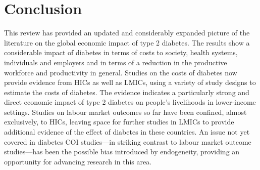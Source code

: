 \section{Conclusion}

This review has provided an updated and considerably expanded picture of the literature on the global economic impact of type 2 diabetes. The results show a considerable impact of diabetes in terms of costs to society, health systems, individuals and employers and in terms of a reduction in the productive workforce and productivity in general. Studies on the costs of diabetes now provide evidence from \acp{HIC} as well as \acp{LMIC}, using a variety of study designs to estimate the costs of diabetes. The evidence indicates a particularly strong and direct economic impact of type 2 diabetes on people's livelihoods in lower-income settings. Studies on labour market outcomes so far have been confined, almost exclusively, to \acp{HIC}, leaving space for further studies in \acp{LMIC} to provide additional evidence of the effect of diabetes in these countries. An issue not yet covered in diabetes \ac{COI} studies---in striking contrast to labour market outcome studies---has been the possible bias introduced by endogeneity, providing an opportunity for advancing research in this area. 
\clearpage

